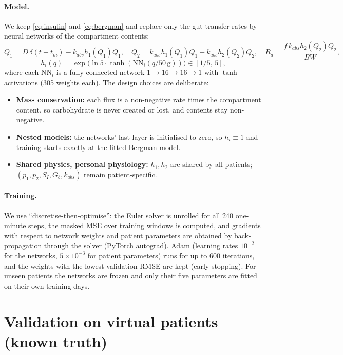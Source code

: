 \documentclass[11pt,a4paper]{article}
\begin{document}
\paragraph{Model.} We keep \eqref{eq:insulin} and \eqref{eq:bergman} and replace only the gut transfer rates by neural networks of the compartment contents:
\begin{equation}
\dot Q_1 = D\,\delta(t-t_m) - k_{abs}h_1(Q_1)Q_1,\quad \dot Q_2 = k_{abs}h_1(Q_1)Q_1 - k_{abs}h_2(Q_2)Q_2,\quad R_a=\frac{f\,k_{abs}h_2(Q_2)Q_2}{BW},
\end{equation}
\begin{equation}
h_i(q) = \exp\!\big(\ln 5\cdot\tanh(\mathrm{NN}_i(q/50\,\mathrm g))\big)\in[1/5,\,5],
\end{equation}
where each $\mathrm{NN}_i$ is a fully connected network $1\to16\to16\to1$ with $\tanh$ activations (305 weights each). The design choices are deliberate:
\begin{itemize}
  \item \textbf{Mass conservation:} each flux is a non-negative rate times the compartment content, so carbohydrate is never created or lost, and contents stay non-negative.
  \item \textbf{Nested models:} the networks' last layer is initialised to zero, so $h_i\equiv1$ and training starts exactly at the fitted Bergman model.
  \item \textbf{Shared physics, personal physiology:} $h_1,h_2$ are shared by all patients; $(p_1,p_2,S_I,G_b,k_{abs})$ remain patient-specific.
\end{itemize}

\paragraph{Training.} We use ``discretise-then-optimise'': the Euler solver is unrolled for all 240 one-minute steps, the masked MSE over training windows is computed, and gradients with respect to network weights and patient parameters are obtained by back-propagation through the solver (PyTorch autograd). Adam (learning rates $10^{-2}$ for the networks, $5\times10^{-3}$ for patient parameters) runs for up to 600 iterations, and the weights with the lowest validation RMSE are kept (early stopping). For unseen patients the networks are frozen and only their five parameters are fitted on their own training days.

\section{Validation on virtual patients (known truth)}
\end{document}
